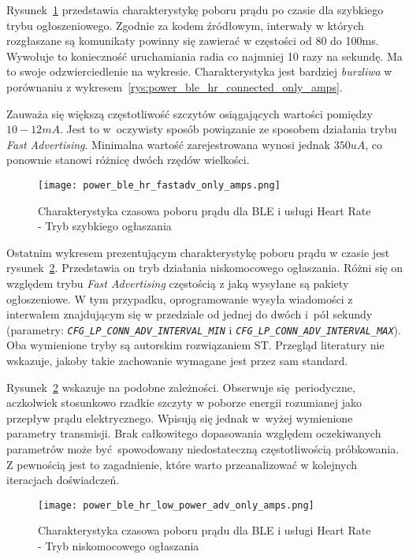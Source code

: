 Rysunek~\ref{rys:power_ble_hr_fastadv_only_amps} przedstawia charakterystykę poboru prądu po czasie
dla szybkiego trybu ogłoszeniowego. Zgodnie za kodem źródłowym, interwały w których rozgłaszane
są komunikaty powinny się zawierać w częstości od 80 do 100ms. Wywołuje to konieczność uruchamiania radia
co najmniej 10 razy na sekundę. Ma to swoje odzwierciedlenie na wykresie. Charakterystyka jest bardziej
\textit{burzliwa} w porównaniu z wykresem~\ref{rys:power_ble_hr_connected_only_amps}. 

Zauważa się większą częstotliwość szczytów osiągających wartości pomiędzy $10-12mA$. Jest to w~oczywisty
sposób powiązanie ze sposobem działania trybu \textit{Fast Advertising}. Minimalna wartość zarejestrowana wynosi jednak
$350uA$, co ponownie stanowi różnicę dwóch rzędów wielkości.

\begin{figure}[!htb]
	\centering \texttt{[image: power\_ble\_hr\_fastadv\_only\_amps.png]}
	\caption{Charakterystyka czasowa poboru prądu dla BLE i usługi Heart Rate - Tryb szybkiego ogłaszania}
	\label{rys:power_ble_hr_fastadv_only_amps}
\end{figure}

Ostatnim wykresem prezentującym charakterystykę poboru prądu w czasie jest rysunek~\ref{rys:power_ble_hr_low_power_adv_only_amps}.
Przedstawia on tryb działania niskomocowego ogłaszania. Różni się on względem trybu \textit{Fast Advertising} częstością z jaką wysyłane
są pakiety ogłoszeniowe. W tym przypadku, oprogramowanie wysyła wiadomości z interwałem znajdującym się w przedziale od 
jednej do dwóch i~pół sekundy (parametry: \textit{\texttt{CFG\_LP\_CONN\_ADV\_INTERVAL\_MIN}} i \textit{\texttt{CFG\_LP\_CONN\_ADV\_INTERVAL\_MAX}}). 
Oba wymienione tryby są autorskim rozwiązaniem ST. Przegląd literatury nie wskazuje, jakoby takie zachowanie wymagane
jest przez sam standard.

Rysunek~\ref{rys:power_ble_hr_low_power_adv_only_amps} wskazuje na podobne zależności. Obserwuje się periodyczne, aczkolwiek
stosunkowo rzadkie szczyty w poborze energii rozumianej jako przepływ prądu elektrycznego. Wpisują się jednak w~wyżej wymienione
parametry transmisji. Brak całkowitego dopasowania względem oczekiwanych parametrów może być spowodowany niedostateczną
częstotliwością próbkowania. Z pewnością jest to zagadnienie, które warto przeanalizować w kolejnych iteracjach doświadczeń.


\begin{figure}[!htb]
	\centering \texttt{[image: power\_ble\_hr\_low\_power\_adv\_only\_amps.png]}
	\caption{Charakterystyka czasowa poboru prądu dla BLE i usługi Heart Rate - Tryb niskomocowego ogłaszania}
	\label{rys:power_ble_hr_low_power_adv_only_amps}
\end{figure}

